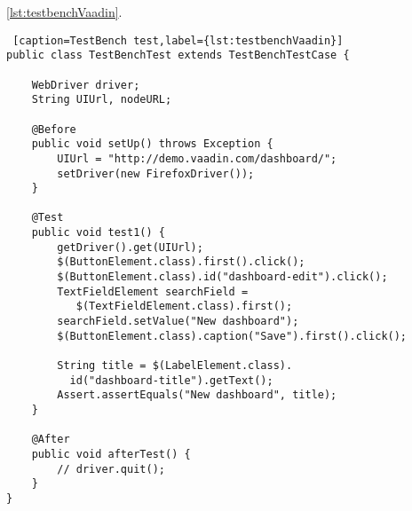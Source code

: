 	
	\ref{lst:testbenchVaadin}.
	\lstset{style=a1listing}
  	\begin{lstlisting} [caption=TestBench test,label={lst:testbenchVaadin}]
public class TestBenchTest extends TestBenchTestCase {

    WebDriver driver;
    String UIUrl, nodeURL;

    @Before
    public void setUp() throws Exception {
        UIUrl = "http://demo.vaadin.com/dashboard/";
        setDriver(new FirefoxDriver());
    }

    @Test
    public void test1() {
        getDriver().get(UIUrl);
        $(ButtonElement.class).first().click();
        $(ButtonElement.class).id("dashboard-edit").click();
        TextFieldElement searchField =
           $(TextFieldElement.class).first();
        searchField.setValue("New dashboard");
        $(ButtonElement.class).caption("Save").first().click();

        String title = $(LabelElement.class).
          id("dashboard-title").getText();
        Assert.assertEquals("New dashboard", title);
    }

    @After
    public void afterTest() {
        // driver.quit();
    }
}  	
\end{lstlisting}